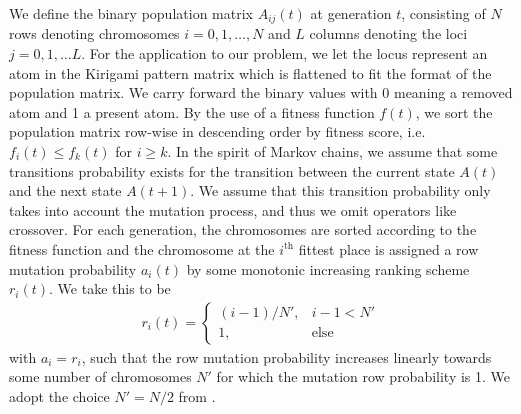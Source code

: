 We define the binary population matrix $A_{ij}(t)$ at generation $t$, consisting of
$N$ rows denoting chromosomes $i = 0, 1, \ldots, N$ and $L$ columns denoting the loci $j = {0, 1, \ldots L}$. For the application to our problem, we let the locus represent an atom in the Kirigami pattern matrix which is flattened to fit the format of the population matrix. We carry forward the binary values with 0 meaning a removed atom and 1 a present atom. By the use of a fitness function $f(t)$, we sort the population matrix row-wise in descending order by fitness score, i.e.\ $f_i(t) \le f_k(t)$ for $i \ge k$. In the spirit of Markov chains, we assume that some transitions probability exists for the transition between the current state
$A(t)$ and the next state $A(t+1)$. We assume that this transition probability
only takes into account the mutation process, and thus we omit operators like
crossover. For each generation, the chromosomes are sorted according to the
fitness function and the chromosome at the $i^{\text{th}}$ fittest place is assigned a row mutation probability $a_i(t)$ by some monotonic increasing ranking scheme $r_i(t)$. We take this to be
\begin{align*}
  r_i(t) = 
  \begin{cases}
    (i-1)/N',& i-1 < N' \\
    1, &\text{else}
  \end{cases}
\end{align*}
with $a_i = r_i$, such that the row mutation probability increases linearly towards some number of chromosomes $N'$ for which the mutation row probability is 1. We adopt the choice $N' = N/2$ from \cite{Wang2010}. 


%
%
%
%
%


